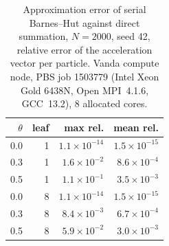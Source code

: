 \begin{table}[t]
\centering\small
\caption{Approximation error of serial Barnes--Hut against direct summation, $N=2000$, seed 42, relative error of the acceleration vector per particle. Vanda compute node, PBS job 1503779 (Intel Xeon Gold 6438N, Open MPI~4.1.6, GCC~13.2), 8 allocated cores.}
\label{tab:approx}
\begin{tabular}{rrrr}
\hline
$\theta$ & leaf & max rel. & mean rel. \\
\hline
0.0 & 1 & $1.1\times10^{-14}$ & $1.5\times10^{-15}$ \\
0.3 & 1 & $1.6\times10^{-2}$ & $8.6\times10^{-4}$ \\
0.5 & 1 & $1.1\times10^{-1}$ & $3.5\times10^{-3}$ \\
0.0 & 8 & $1.1\times10^{-14}$ & $1.5\times10^{-15}$ \\
0.3 & 8 & $8.4\times10^{-3}$ & $6.7\times10^{-4}$ \\
0.5 & 8 & $5.9\times10^{-2}$ & $3.0\times10^{-3}$ \\
\hline
\end{tabular}
\end{table}
